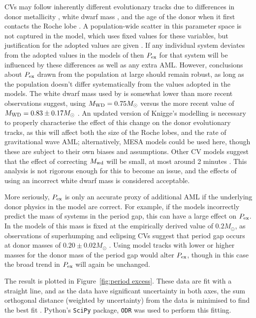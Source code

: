 CVs may follow inherently different evolutionary tracks due to differences in donor metallicity \citep{stehle1997, harrison2016}, white dwarf mass \citep{knigge2006}, and the age of the donor when it first contacts the Roche lobe \citep{howell2001}. A population-wide scatter in this parameter space is not captured in the \citet{knigge11} model, which uses fixed values for these variables, but justification for the adopted values are given \citep{knigge11, knigge2006}.
If any individual system deviates from the adopted values in the models of \citet{knigge11} then $P_{\rm ex}$ for that system will be influenced by these differences as well as any extra AML. However, conclusions about $P_{\rm ex}$ drawn from the population at large should remain robust, as long as the population doesn't differ systematically from the values adopted in the models.
The white dwarf mass used by \citet{knigge11} is somewhat lower than more recent observations suggest, using $M_{\rm WD} = 0.75 M_\odot$ versus the more recent value of $M_{\rm WD} = 0.83 \pm 0.17 M_\odot$ \citep{pala2020}.
An updated version of Knigge's modelling is necessary to properly characterise the effect of this change on the donor evolutionary tracks, as this will affect both the size of the Roche lobes, and the rate of gravitational wave AML; alternatively, MESA models could be used here, though these are subject to their own biases and assumptions.
Other CV models suggest that the effect of correcting $M_{\rm wd}$ will be small, at most around 2 minutes \citep{goliasch2015}. This analysis is not rigorous enough for this to become an issue, and the effects of using an incorrect white dwarf mass is considered acceptable.

More seriously, $P_{\rm ex}$ is only an accurate proxy of additional AML if the underlying donor physics in the model are correct. For example, if the models incorrectly predict the mass of systems in the period gap, this can have a large effect on $P_{\rm ex}$. In the models of \citet{knigge11} this mass is fixed at the empirically derived value of $0.2 M_\odot$, as observations of superhumping and eclipsing CVs suggest that period gap occurs at donor masses of $0.20 \pm 0.02 M_\odot$ \citep{knigge2006}. Using model tracks with lower or higher masses for the donor mass of the period gap would alter $P_{\rm ex}$, though in this case the broad trend in $P_{\rm ex}$ will again be unchanged.

The result is plotted in Figure~\ref{fig:period excess}. These data are fit with a straight line, and as the data have significant uncertainty in both axes, the sum orthogonal distance (weighted by uncertainty) from the data is minimised to find the best fit \citep{hogg2010}. Python's \lstinline{SciPy} package, \lstinline{ODR} was used to perform this fitting.

